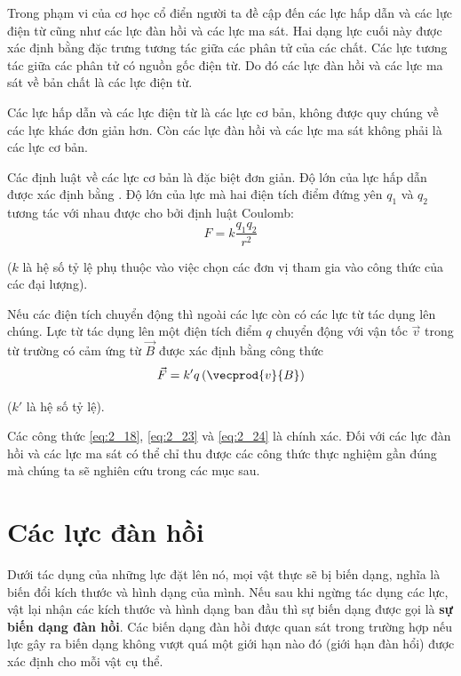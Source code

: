 Trong phạm vi của cơ học cổ điển người ta đề cập đến các lực hấp dẫn và các lực điện từ cũng như các lực đàn hồi và các lực ma sát. Hai dạng lực cuối này được xác định bằng đặc trưng tương tác giữa các phân tử của các chất. Các lực tương tác giữa các phân tử có nguồn gốc điện từ. Do đó các lực đàn hồi và các lực ma sát về bản chất là các lực điện từ.

Các lực hấp dẫn và các lực điện từ là các lực cơ bản, không được quy chúng về các lực khác đơn giản hơn. Còn các lực đàn hồi và các lực ma sát không phải là các lực cơ bản.

Các định luật về các lực cơ bản là đặc biệt đơn giản. Độ lớn của lực hấp dẫn được xác định bằng . Độ lớn của lực mà hai điện tích điểm đứng yên $q_1$ và $q_2$ tương tác với nhau được cho bởi định luật Coulomb:
\vspace{-12pt}
\begin{equation}\label{eq:2_23}
F = k\frac{q_1q_2}{r^2}
\end{equation}

\noindent
($k$ là hệ số tỷ lệ phụ thuộc vào việc chọn các đơn vị tham gia vào công thức của các đại lượng).

Nếu các điện tích chuyển động thì ngoài các lực  còn có các lực từ tác dụng lên chúng. Lực từ tác dụng lên một điện tích điểm $q$ chuyển động với vận tốc $\vec{v}$ trong từ trường có cảm ứng từ $\vec{B}$ được xác định bằng công thức
\begin{equation}\label{eq:2_24}
\vec{F} = k'q\,(\vecprod{v}{B})
\end{equation}

\noindent
($k'$ là hệ số tỷ lệ).

Các công thức \eqref{eq:2_18}, \eqref{eq:2_23} và \eqref{eq:2_24} là chính xác. Đối với các lực đàn hồi và các lực ma sát có thể chỉ thu được các công thức thực nghiệm gần đúng mà chúng ta sẽ nghiên cứu trong các mục sau.

\section{Các lực đàn hồi}\label{sec:2_9}

Dưới tác dụng của những lực đặt lên nó, mọi vật thực sẽ bị biến dạng, nghĩa là biến đổi kích thước và hình dạng của mình. Nếu sau khi ngừng tác dụng các lực, vật lại nhận các kích thước và hình dạng ban đầu thì sự biến dạng được gọi là \textbf{sự biến dạng đàn hồi}. Các biến dạng đàn hồi được quan sát trong trường hợp nếu lực gây ra biến dạng không vượt quá một giới hạn nào đó (giới hạn đàn hổi) được xác định cho mỗi vật cụ thể.

